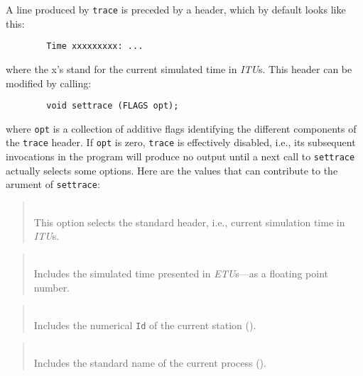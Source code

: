 A line produced by {\tt trace}
is preceded by a header, which by default looks like this:
\begin{verbatim}
        Time xxxxxxxxx: ...
\end{verbatim}
\noindent
where the x's stand for the current simulated time in {\em ITU\/}s.
This header can be modified by calling:
\begin{verbatim}
        void settrace (FLAGS opt);
\end{verbatim}
where {\tt opt} is a collection of additive flags identifying the different
components of the {\tt trace} header.
If {\tt opt} is zero, {\tt trace} is effectively disabled, i.e., its subsequent
invocations in the program will produce no output until a next call to
{\tt settrace} actually selects some options.
Here are the values that can contribute to the arument of {\tt settrace}:

\begin{quote}
\noindent{}\\ \hspace{0in}
This option selects the standard header, i.e., current simulation time
in {\em ITU\/}s.
\end{quote}

\begin{quote}
\noindent{}\\ \hspace{0in}
Includes the simulated time presented in {\em ETU\/}s---as a floating point
number.
\end{quote}

\begin{quote}
\noindent{}\\ \hspace{0in}
Includes the numerical {\tt Id} of the current station ().
\end{quote}

\begin{quote}
\noindent{}\\ \hspace{0in}
Includes the standard name of the current process ().
\end{quote}

